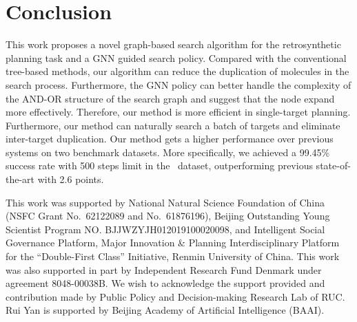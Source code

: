 \documentclass[sigconf]{acmart}
\begin{document}
\section{Conclusion}
This work proposes a novel graph-based search algorithm for the retrosynthetic planning task and a GNN guided search policy. Compared with the conventional tree-based methods, our algorithm can reduce the duplication of molecules in the search process. Furthermore, the GNN policy can better handle the complexity of the AND-OR structure of the search graph and suggest that the node expand more effectively. Therefore, our method is more efficient in single-target planning. Furthermore, our method can naturally search a batch of targets and eliminate inter-target duplication. Our method gets a higher performance over previous systems on two benchmark datasets. More specifically, we achieved a 99.45\% success rate with 500 steps limit in the \uspto~dataset, outperforming previous state-of-the-art with 2.6 points.

\begin{acks}
This work was supported by National Natural Science Foundation of China (NSFC Grant No.~62122089 and No.~61876196), Beijing Outstanding Young Scientist Program NO. BJJWZYJH012019100020098, and Intelligent Social Governance Platform, Major Innovation \& Planning Interdisciplinary Platform for the ``Double-First Class'' Initiative, Renmin University of China.
This work was also supported in part by Independent Research Fund Denmark under agreement  8048-00038B.
We wish to acknowledge the support provided and contribution made by Public Policy and Decision-making Research Lab of RUC.
Rui Yan is supported by Beijing Academy of Artificial Intelligence (BAAI).
\end{acks}




\appendix
\end{document}

